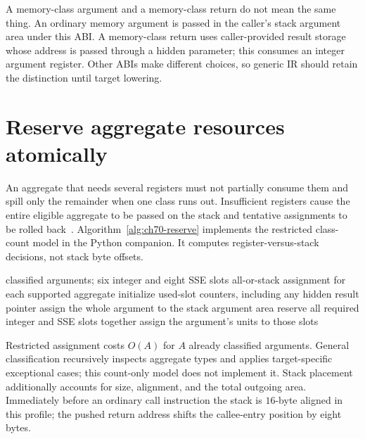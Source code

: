 A memory-class argument and a memory-class return do not mean the same thing.
An ordinary memory argument is passed in the caller's stack argument area under this ABI.
A memory-class return uses caller-provided result storage whose address is passed through a hidden parameter; this consumes an integer argument register.
Other ABIs make different choices, so generic IR should retain the distinction until target lowering.

\section{Reserve aggregate resources atomically}
\label{sec:ch70-registers}
An aggregate that needs several registers must not partially consume them and spill only the remainder when one class runs out.
Insufficient registers cause the entire eligible aggregate to be passed on the stack and tentative assignments to be rolled back~\cite{matz-2012-amd64}.
Algorithm~\ref{alg:ch70-reserve} implements the restricted class-count model in the Python companion.
It computes register-versus-stack decisions, not stack byte offsets.

\begin{algorithm}[htbp]
\caption{Assign registers in the restricted scalar and two-unit aggregate profile.}
\label{alg:ch70-reserve}
\begin{pseudocode}
\Require classified arguments; six integer and eight SSE slots
\Ensure all-or-stack assignment for each supported aggregate
\State initialize used-slot counters, including any hidden result pointer
    \State assign the whole argument to the stack argument area
  \Else
    \State reserve all required integer and SSE slots together
    \State assign the argument's units to those slots
  \EndIf
\EndFor
\end{pseudocode}
\end{algorithm}

Restricted assignment costs $O(A)$ for $A$ already classified arguments.
General classification recursively inspects aggregate types and applies target-specific exceptional cases; this count-only model does not implement it.
Stack placement additionally accounts for size, alignment, and the total outgoing area.
Immediately before an ordinary call instruction the stack is $16$-byte aligned in this profile; the pushed return address shifts the callee-entry position by eight bytes.

